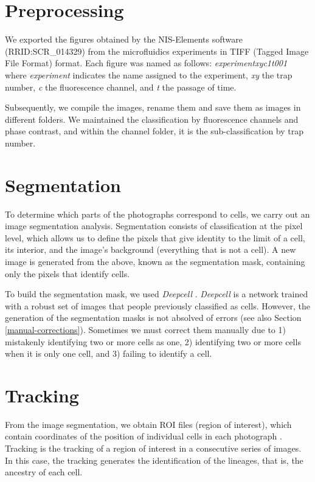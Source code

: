 \documentclass[
  12pt,
  a4paper,
  oneside]{krantz}
\begin{document}
\hypertarget{preprocessing}{%
\section{Preprocessing}\label{preprocessing}}

We exported the figures obtained by the NIS-Elements software
(RRID:SCR\_014329) from the microfluidics experiments in TIFF (Tagged
Image File Format) format. Each figure was named as follows:
\emph{experimentxyc1t001} where \emph{experiment} indicates the name assigned to
the experiment, \emph{xy} the trap number, \emph{c} the fluorescence channel, and
\emph{t} the passage of time.

Subsequently, we compile the images, rename them and save them as images
in different folders. We maintained the classification by fluorescence
channels and phase contrast, and within the channel folder, it is the
sub-classification by trap number.

\hypertarget{segmentation}{%
\section{Segmentation}\label{segmentation}}

To determine which parts of the photographs correspond to cells, we
carry out an image segmentation analysis. Segmentation consists of
classification at the pixel level, which allows us to define the pixels
that give identity to the limit of a cell, its interior, and the image's
background (everything that is not a cell). A new image is generated
from the above, known as the segmentation mask, containing only the
pixels that identify cells.

To build the segmentation mask, we used \emph{Deepcell} \citep{vanvalen2016}.
\emph{Deepcell} is a network trained with a robust set of images that people
previously classified as cells. However, the generation of the
segmentation masks is not absolved of errors (see also Section
\ref{manual-corrections}). Sometimes we must correct them manually due
to 1) mistakenly identifying two or more cells as one, 2) identifying
two or more cells when it is only one cell, and 3) failing to identify a
cell.

\hypertarget{tracking}{%
\section{Tracking}\label{tracking}}

From the image segmentation, we obtain ROI files (region of interest),
which contain coordinates of the position of individual cells in each
photograph \citep{10.5555/1386553}. Tracking is the tracking of a region of
interest in a consecutive series of images. In this case, the tracking
generates the identification of the lineages, that is, the ancestry of
each cell.
\end{document}
